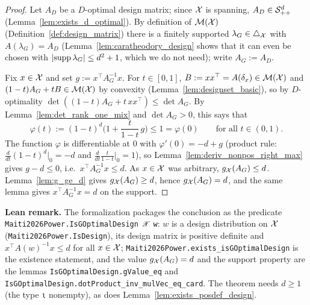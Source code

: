 \begin{proof}
\leanok
{}
Let $A_D$ be a $D$-optimal design matrix; since $\mathcal{X}$ is spanning, $A_D \in \mathcal{S}_{++}^{d}$
(Lemma~\ref{lem:exists_d_optimal}). By definition of $\mathcal{M}(\mathcal{X})$
(Definition~\ref{def:design_matrix}) there is a finitely supported $\lambda_G \in \triangle_{\mathcal{X}}$
with $A(\lambda_G) = A_D$ (Lemma~\ref{lem:caratheodory_design} shows that it can even be chosen
with $\lvert \operatorname{supp}\lambda_G \rvert \le d^2+1$, which we do not need); write $A_G := A_D$.

Fix $x \in \mathcal{X}$ and set $g := x^\top A_G^{-1}x$. For $t \in [0,1]$, $B := xx^\top = A(\delta_x)
\in \mathcal{M}(\mathcal{X})$ and $(1-t)A_G + tB \in \mathcal{M}(\mathcal{X})$ by convexity
(Lemma~\ref{lem:designset_basic}), so by $D$-optimality $\det((1-t)A_G + t\,xx^\top) \le \det A_G$.
By Lemma~\ref{lem:det_rank_one_mix} and $\det A_G > 0$, this says that
\[
  \varphi(t) := (1-t)^d\Big(1 + \frac{t}{1-t}\,g\Big) \le 1 = \varphi(0)
  \qquad\text{for all } t \in (0,1) .
\]
The function $\varphi$ is differentiable at $0$ with $\varphi'(0) = -d + g$ (product rule:
$\frac{d}{dt}(1-t)^d|_{0} = -d$ and $\frac{d}{dt}\frac{t}{1-t}|_0 = 1$), so
Lemma~\ref{lem:deriv_nonpos_right_max} gives $g - d \le 0$, i.e.\ $x^\top A_G^{-1}x \le d$.
As $x \in \mathcal{X}$ was arbitrary, $g_{\mathcal{X}}(A_G) \le d$. Lemma~\ref{lem:g_ge_d} gives
$g_{\mathcal{X}}(A_G) \ge d$, hence $g_{\mathcal{X}}(A_G) = d$, and the same lemma gives
$x^\top A_G^{-1}x = d$ on the support.
\end{proof}

\textbf{Lean remark.} The formalization packages the conclusion as the predicate
\texttt{Maiti2026Power.IsGOptimalDesign 𝒳 w}: $w$ is a design distribution on $\mathcal{X}$
(\texttt{Maiti2026Power.IsDesign}), its design matrix is positive definite and
$x^\top A(w)^{-1}x \le d$ for all $x \in \mathcal{X}$; \texttt{Maiti2026Power.exists\_isGOptimalDesign} is the
existence statement, and the value $g_{\mathcal{X}}(A_G) = d$ and the support property are the lemmas
\texttt{IsGOptimalDesign.gValue\_eq} and \texttt{IsGOptimalDesign.dotProduct\_inv\_mulVec\_eq\_card}.
The theorem needs $d \ge 1$ (the type \texttt{ι} nonempty), as does
Lemma~\ref{lem:exists_posdef_design}.


